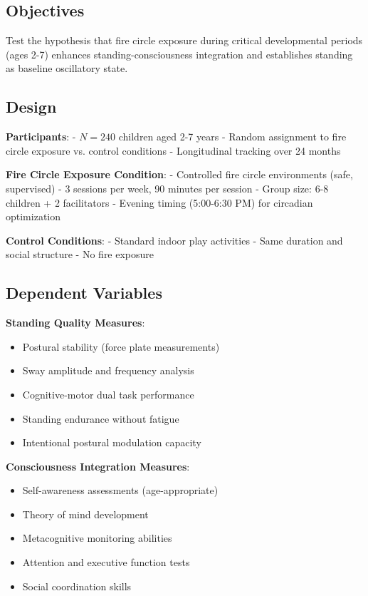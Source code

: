 \documentclass[12pt]{article}
\begin{document}
\subsection{Objectives}

Test the hypothesis that fire circle exposure during critical developmental periods (ages 2-7) enhances standing-consciousness integration and establishes standing as baseline oscillatory state.

\subsection{Design}

\textbf{Participants}: 
- $N = 240$ children aged 2-7 years
- Random assignment to fire circle exposure vs. control conditions
- Longitudinal tracking over 24 months

\textbf{Fire Circle Exposure Condition}:
- Controlled fire circle environments (safe, supervised)
- 3 sessions per week, 90 minutes per session
- Group size: 6-8 children + 2 facilitators
- Evening timing (5:00-6:30 PM) for circadian optimization

\textbf{Control Conditions}:
- Standard indoor play activities
- Same duration and social structure
- No fire exposure

\subsection{Dependent Variables}

\textbf{Standing Quality Measures}:
\begin{itemize}
\item Postural stability (force plate measurements)
\item Sway amplitude and frequency analysis
\item Cognitive-motor dual task performance
\item Standing endurance without fatigue
\item Intentional postural modulation capacity
\end{itemize}

\textbf{Consciousness Integration Measures}:
\begin{itemize}
\item Self-awareness assessments (age-appropriate)
\item Theory of mind development
\item Metacognitive monitoring abilities
\item Attention and executive function tests
\item Social coordination skills
\end{itemize}
\end{document}
